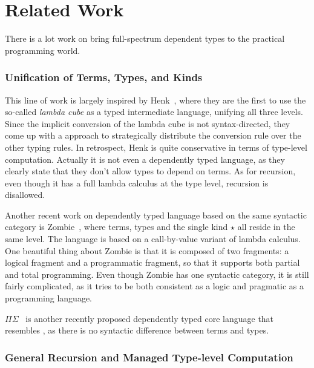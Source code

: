 \section{Related Work}

There is a lot work on bring full-spectrum dependent types to the practical programming world.

\subsubsection{Unification of Terms, Types, and Kinds}
This line of work is largely inspired by Henk~\cite{pts:henk}, where they are the first to use the so-called \emph{lambda cube} as a typed intermediate language, unifying all three levels. Since the implicit conversion of the lambda cube is not syntax-directed, they come up with a approach to strategically distribute the conversion rule over the other typing rules. In retrospect, Henk is quite conservative in terms of type-level computation. Actually it is not even a dependently typed language, as they clearly state that they don't allow types to depend on terms. As for recursion, even though it has a full lambda calculus at the type level, recursion is disallowed.

Another recent work on dependently typed language based on the same syntactic category is \textsf{Zombie}~\cite{zombie:popl14, zombie:thesis}, where terms, types and the single kind $\star$ all reside in the same level. The language is based on a call-by-value variant of lambda calculus. One beautiful thing about Zombie is that it is composed of two fragments: a logical fragment and a programmatic fragment, so that it supports both partial and total programming. Even though Zombie has one syntactic category, it is still fairly complicated, as it tries to be both consistent as a logic and pragmatic as a programming language.

$\Pi\Sigma$~\cite{dep:pisigma} is another recently proposed dependently typed core language that resembles \name, as there is no syntactic difference between terms and types.\bruno{}


\subsubsection{General Recursion and Managed Type-level Computation}

